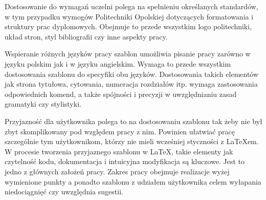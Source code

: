 Dostosowanie do wymagań uczelni polega na spełnieniu określanych standardów, w tym przypadku wymogów Politechniki Opolskiej dotyczących formatowania i struktury prac dyplomowych. Obejmuje to przede wszystkim logo politechniki, układ stron, styl bibliografii czy inne aspekty pracy.

Wspieranie różnych języków pracy szablon umożliwia pisanie pracy zarówno w języku polskim jak i w języku angielskim. Wymaga to przede wszystkim dostosowania szablonu do specyfiki obu języków. Dostosowania takich elementów jak strona tytułowa, cytowania, numeracja rozdziałów itp. wymaga zastosowania odpowiednich komend, a także spójności i precyzji w uwzględnianiu zasad gramatyki czy stylistyki.

Przyjazność dla użytkownika polega to na dostosowaniu szablonu tak żeby nie był zbyt skomplikowany pod względem pracy z nim. Powinien ułatwiać pracę szczególnie tym użytkownikom, którzy nie mieli wcześniej styczności z \LaTeX{em}. W procesie tworzenia przyjaznego szablonu w LaTeX, takie elementy jak czytelność kodu, dokumentacja i intuicyjna modyfikacja są kluczowe. Jest to jedno z głównych założeń pracy.
Zakres pracy obejmuje realizacje wyżej wymienione punkty a ponadto szablonu z udziałem użytkownika celem wyłapania niedociągnięć czy uwzględnia sugestii. 
